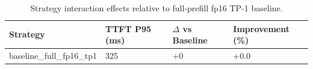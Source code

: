 \begin{table}
\caption{Strategy interaction effects relative to full-prefill fp16 TP-1 baseline.}
\label{tab:interactions}
\begin{tabular}{llll}
\toprule
Strategy & TTFT P95 (ms) & $\Delta$ vs Baseline & Improvement (\%) \\
\midrule
baseline\_full\_fp16\_tp1 & 325 & +0 & +0.0 \\
\bottomrule
\end{tabular}
\end{table}
